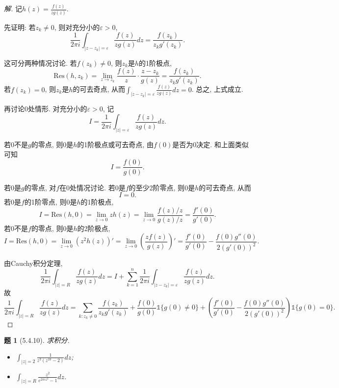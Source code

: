 \documentclass{article}[a4paper, 12pt]
\theoremstyle{mystyle}
\newtheorem{problem}{题}
\newenvironment{solution}{\begin{proof}[解]}{\end{proof}}
\begin{document}
\begin{solution}
  记\(h(z)=\frac{f(z)}{zg(z)}\).

  先证明: 若\(z_k\ne0\), 则对充分小的\(\varepsilon>0\),\[\frac{1}{2\pi i}\int_{|z-z_k|=\varepsilon}\frac{f(z)}{zg(z)}dz=\frac{f(z_k)}{z_kg'(z_k)}.\] 
  
  这可分两种情况讨论. 若\(f(z_k)\ne 0\), 则\(z_k\)是\(h\)的1阶极点, \[\text{Res}(h,z_k)=\lim_{z\to z_k}\frac{f(z)}{z}\cdot\frac{z-z_k}{g(z)}=\frac{f(z_k)}{z_kg'(z_k)}.\] 若\(f(z_k)=0\), 则\(z_k\)是\(h\)的可去奇点, 从而\(\int_{|z-z_k|=\varepsilon}\frac{f(z)}{zg(z)}dz=0\). 总之, 上式成立.

  再讨论\(0\)处情形. 对充分小的\(\varepsilon>0\), 记\[I=\frac{1}{2\pi i}\int_{|z|=\varepsilon}\frac{f(z)}{zg(z)}dz.\]
  
  若\(0\)不是\(g\)的零点, 则\(0\)是\(h\)的1阶极点或可去奇点, 由\(f(0)\)是否为0决定. 和上面类似可知\[I=\frac{f(0)}{g(0)}.\]

  若\(0\)是\(g\)的零点, 对\(f\)在0处情况讨论. \newline 若\(0\)是\(f\)的至少2阶零点, 则\(0\)是\(h\)的可去奇点, 从而\[I=0.\] 若\(0\)是\(f\)的1阶零点, 则\(0\)是\(h\)的1阶极点, \[I=\text{Res}(h,0)=\lim_{z\to0}zh(z)=\lim_{z\to0}\frac{f(z)/z}{g(z)/z}=\frac{f'(0)}{g'(0)}.\] 若\(0\)不是\(f\)的零点, 则\(0\)是\(h\)的2阶极点, \[I=\text{Res}(h,0)=\lim_{z\to0}(z^2h(z))'=\lim_{z\to0}\left(\frac{zf(z)}{g(z)}\right)'=\frac{f'(0)}{g'(0)}-\frac{f(0)g''(0)}{2(g'(0))^2}.\]

  由Cauchy积分定理, \[\frac{1}{2\pi i}\int_{|z|=R}\frac{f(z)}{zg(z)}dz=I+\sum_{k=1}^n\frac{1}{2\pi i}\int_{|z-z_k|=\varepsilon}\frac{f(z)}{zg(z)}dz.\] 故\[\frac{1}{2\pi i}\int_{|z|=R}\frac{f(z)}{zg(z)}dz=\sum_{k:z_k\ne0}\frac{f(z_k)}{z_kg'(z_k)}+\frac{f(0)}{g(0)}\mathbb{1}\{g(0)\ne0\}+\left(\frac{f'(0)}{g'(0)}-\frac{f(0)g''(0)}{2(g'(0))^2}\right)\mathbb{1}\{g(0)=0\}.\tag*{\(\qed\)}\]
  \renewcommand{\qedsymbol}{}
\end{solution}

\begin{problem}[5.4.10]
  求积分.
  \begin{itemize}
    \item [(1)] \(\int_{|z|=2}\frac{1}{z^3(z^{10}-2)}dz\);
    \item [(4)] \(\int_{|z|=R}\frac{z^2}{e^{2\pi i z^3}-1}dz\).
  \end{itemize}
\end{problem}
\end{document}
